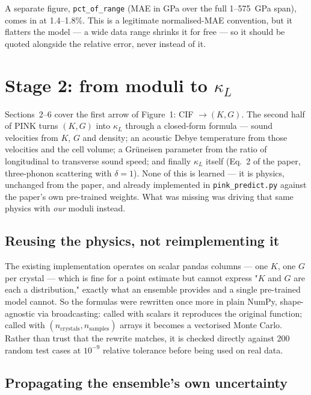 \documentclass[11pt,a4paper]{article}
\begin{document}
A separate figure, \texttt{pct\_of\_range} (MAE in GPa over the full 1--575~GPa
span), comes in at 1.4--1.8\%. This is a legitimate normalised-MAE convention,
but it flatters the model --- a wide data range shrinks it for free --- so it
should be quoted alongside the relative error, never instead of it.

\section{Stage 2: from moduli to \texorpdfstring{$\kappa_L$}{kappa\_L}}

Sections~2--6 cover the first arrow of Figure~1: CIF $\rightarrow (K, G)$. The
second half of PINK turns $(K, G)$ into $\kappa_L$ through a closed-form
formula --- sound velocities from $K$, $G$ and density; an acoustic Debye
temperature from those velocities and the cell volume; a Gr\"uneisen parameter
from the ratio of longitudinal to transverse sound speed; and finally $\kappa_L$
itself (Eq.~2 of the paper, three-phonon scattering with $\delta = 1$). None of
this is learned --- it is physics, unchanged from the paper, and already
implemented in \texttt{pink\_predict.py} against the paper's own pre-trained
weights. What was missing was driving that same physics with \emph{our}
moduli instead.

\subsection{Reusing the physics, not reimplementing it}

The existing implementation operates on scalar pandas columns --- one $K$, one
$G$ per crystal --- which is fine for a point estimate but cannot express "$K$
and $G$ are each a distribution," exactly what an ensemble provides and a
single pre-trained model cannot. So the formulas were rewritten once more in
plain NumPy, shape-agnostic via broadcasting: called with scalars it reproduces
the original function; called with $(n_{\text{crystals}}, n_{\text{samples}})$
arrays it becomes a vectorised Monte Carlo. Rather than trust that the rewrite
matches, it is checked directly against 200 random test cases at
$10^{-9}$ relative tolerance before being used on real data.

\subsection{Propagating the ensemble's own uncertainty}
\end{document}
